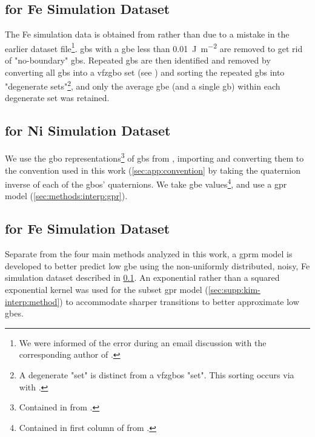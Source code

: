 \documentclass[preprint,12pt]{elsarticle}
\begin{document}
\subsection{ for Fe Simulation Dataset} %
\label{sec:methods:gprsim}
The Fe simulation data is obtained from \cite{kimPhasefieldModeling3D2014} rather than \cite{kimIdentificationSchemeGrain2011} due to a mistake in the earlier dataset file\footnote{We were informed of the error during an email discussion with the corresponding author of \cite{kimPhasefieldModeling3D2014}.}. \Glspl{gb} with a \gls{gbe} less than \SI{0.01}{\joule\per\square\meter} are removed to get rid of "no-boundary" \glspl{gb}. Repeated \glspl{gb} are then identified and removed by converting all \glspl{gb} into a \gls{vfzgbo} set (see ) and sorting the repeated \glspl{gb} into "degenerate sets"\footnote{A degenerate "set" is distinct from a \glspl{vfzgbo} "set". This sorting occurs via  with .}, and only the average \gls{gbe} (and a single \gls{gb}) within each degenerate set was retained. %

\subsection{ for Ni Simulation Dataset}
\label{sec:methods:gprsim-Ni}

We use the \gls{gbo} representations\footnote{Contained in  from \citet{chesserGBOctonionCode2019}. } \cite{chesserLearningGrainBoundary2020} of \glspl{gb} from \cite{olmstedSurveyComputedGrain2009}, importing and converting them to the convention used in this work (\cref{sec:app:convention} by taking the quaternion inverse of each of the \glspl{gbo}' quaternions. We take \gls{gbe} values\footnote{Contained in first column of  from  \citet{chesserGBOctonionCode2019}. }, and use a \gls{gpr} model (\cref{sec:methods:interp:gpr}).

\subsection{ for Fe Simulation Dataset}
\label{sec:methods:gprmix}
Separate from the four main methods analyzed in this work, a \gls{gprm} model is developed to better predict low \gls{gbe} using the non-uniformly distributed, noisy, Fe simulation dataset described in \cref{sec:methods:gprsim}. An exponential rather than a squared exponential kernel was used for the subset \gls{gpr} model (\cref{sec:supp:kim-interp:method}) to accommodate sharper transitions to better approximate low \glspl{gbe}.
\end{document}

